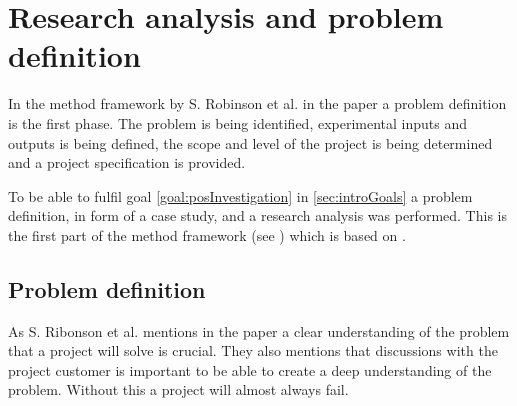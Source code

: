 \section{Research analysis and problem definition}\label{sec:methodProblemDefinition}
In the method framework by S. Robinson et al. in the paper \cite{SecretsSuccessfulSimulation1995} a problem definition is the first phase.
The problem is being identified, experimental inputs and outputs is being defined, the scope and level of the project is being determined and a project specification is provided.





\bigskip

To be able to fulfil goal \ref{goal:posInvestigation} in \cref{sec:introGoals} a problem definition, in form of a case study, and a research analysis was performed.
This is the first part of the method framework (see ) which is based on \cite{SecretsSuccessfulSimulation1995}.


\subsection{Problem definition}\label{sec:methodProblemDefinition}
As S. Ribonson et al. mentions in the paper \cite{SecretsSuccessfulSimulation1995} a clear understanding of the problem that a project will solve is crucial.
They also mentions that discussions with the project customer is important to be able to create a deep understanding of the problem.
Without this a project will almost always fail.

